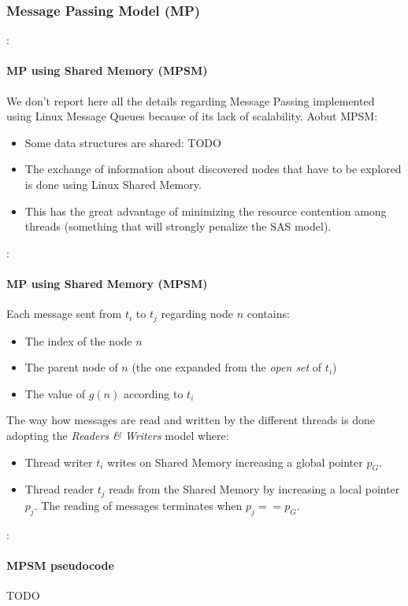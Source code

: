 \documentclass[12pt]{beamer}
\begin{document}
	\subsubsection{Message Passing Model (MP)}
	\begin{frame}{\secname : \subsecname}
		\framesubtitle{MP using Shared Memory (MPSM)}
		We don't report here all the details regarding Message Passing implemented using Linux Message Queues
		because of its lack of scalability. Aobut MPSM:
		\begin{itemize}
			\item Some data structures are shared: TODO
			\item The exchange of information about discovered nodes that have to be explored is done
				  using Linux Shared Memory.
			\item This has the great advantage of minimizing the resource contention among threads 
			      (something that will strongly penalize the SAS model).
		\end{itemize}
	\end{frame}
	\begin{frame}{\secname : \subsecname}
		\framesubtitle{MP using Shared Memory (MPSM)}
		Each message sent from $t_i$ to $t_j$ regarding node $n$ contains:
		\begin{itemize}
			\item The index of the node $n$
			\item The parent node of $n$ (the one expanded from the \textit{open set} of $t_i$)
			\item The value of $g(n)$ according to $t_i$
		\end{itemize}
		The way how messages are read and written by the different threads is done adopting the \textit{Readers \& Writers}
		model where:
		\begin{itemize}
		\item Thread writer $t_i$ writes on Shared Memory increasing a global pointer $p_G$.
		\item Thread reader $t_j$ reads from the Shared Memory by increasing a local pointer $p_j$. The reading
				of messages terminates when $p_j == p_G$.
		\end{itemize}
	\end{frame}
	\begin{frame}{\secname : \subsecname}
		\framesubtitle{MPSM pseudocode}
		TODO
	\end{frame}
\end{document}
